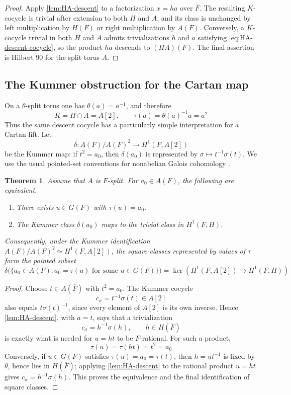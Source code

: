 \documentclass[11pt]{amsart}
\newtheorem{theorem}{Theorem}[section]
\theoremstyle{definition}
\theoremstyle{remark}
\newcommand{\Fb}{\overline F}
\begin{document}
\begin{proof}
Apply \cref{lem:HA-descent} to a factorization $x=ha$ over $\Fb$.  The
resulting $K$-cocycle is trivial after extension to both $H$ and $A$, and its
class is unchanged by left multiplication by $H(F)$ or right multiplication
by $A(F)$.  Conversely, a $K$-cocycle trivial in both $H$ and $A$ admits
trivializations $h$ and $a$ satisfying \eqref{eq:HA-descent-cocycle}, so the
product $ha$ descends to $(HA)(F)$.  The final assertion is Hilbert 90 for the
split torus $A$.
\end{proof}

\subsection{The Kummer obstruction for the Cartan map}
On a $\theta$-split torus one has $\theta(a)=a^{-1}$, and therefore
\[
 K=H\cap A=A[2],
 \qquad
 \tau(a)=\theta(a)^{-1}a=a^2
\]
Thus the same descent cocycle has a particularly simple interpretation for a
Cartan lift.  Let
\[
 \delta:A(F)/A(F)^2\longrightarrow H^1(F,A[2])
\]
be the Kummer map: if $t^2=a_0$, then $\delta(a_0)$ is represented by
$\sigma\mapsto t^{-1}\sigma(t)$.  We use the usual pointed-set conventions
for nonabelian Galois cohomology \cite{Serre}.

\begin{theorem}\label{thm:kummer-criterion}
Assume that $A$ is $F$-split.  For $a_0\in A(F)$, the following are equivalent.
\begin{enumerate}[label=\textup{(\alph*)},leftmargin=2.3em]
\item There exists $u\in G(F)$ with $\tau(u)=a_0$.
\item The Kummer class $\delta(a_0)$ maps to the trivial class in $H^1(F,H)$.
\end{enumerate}
Consequently, under the Kummer identification
$A(F)/A(F)^2\simeq H^1(F,A[2])$, the square-classes represented by values of
$\tau$ form the pointed subset
\begin{equation}\label{eq:tau-image-kernel}
 \delta\bigl(\{a_0\in A(F):a_0=\tau(u)
                   \text{ for some }u\in G(F)\}\bigr)
 =
 \ker\left(H^1(F,A[2])\longrightarrow H^1(F,H)\right)
\end{equation}
\end{theorem}

\begin{proof}
Choose $t\in A(\Fb)$ with $t^2=a_0$.  The Kummer cocycle
\[
 c_\sigma=t^{-1}\sigma(t)\in A[2]
\]
also equals $t\sigma(t)^{-1}$, since every element of $A[2]$ is its own
inverse.  Hence \cref{lem:HA-descent}, with $a=t$, says that a trivialization
\[
 c_\sigma=h^{-1}\sigma(h),\qquad h\in H(\Fb)
\]
is exactly what is needed for $u=ht$ to be $F$-rational.  For such a product,
\[
 \tau(u)=\tau(ht)=t^2=a_0
\]
Conversely, if $u\in G(F)$ satisfies $\tau(u)=a_0=\tau(t)$, then
$h=ut^{-1}$ is fixed by $\theta$, hence lies in $H(\Fb)$; applying
\cref{lem:HA-descent} to the rational product $u=ht$ gives
$c_\sigma=h^{-1}\sigma(h)$.  This proves the equivalence and the final
identification of square classes.
\end{proof}
\end{document}
